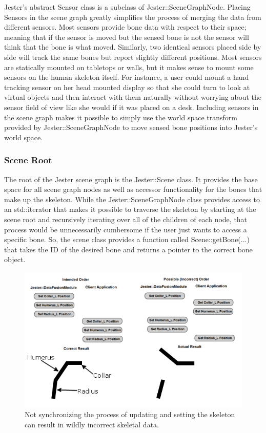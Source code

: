 Jester’s abstract Sensor class is a subclass of Jester::SceneGraphNode. Placing Sensors in the scene graph greatly simplifies the process of merging the data from different sensors. Most sensors provide bone data with respect to their space; meaning that if the sensor is moved but the sensed bone is not the sensor will think that the bone is what moved. Similarly, two identical sensors placed side by side will track the same bones but report slightly different positions. Most sensors are statically mounted on tabletops or walls, but it makes sense to mount some sensors on the human skeleton itself. For instance, a user could mount a hand tracking sensor on her head mounted display so that she could turn to look at virtual objects and then interact with them naturally without worrying about the sensor field of view like she would if it was placed on a desk. Including sensors in the scene graph makes it possible to simply use the world space transform provided by Jester::SceneGraphNode to move sensed bone positions into Jester’s world space. 

\subsubsection{Scene Root}\label{sec:scene_impl}

The root of the Jester scene graph is the Jester::Scene class. It provides the base space for all scene graph nodes as well as accessor functionality for the bones that make up the skeleton. While the Jester::SceneGraphNode class provides access to an std::iterator that makes it possible to traverse the skeleton by starting at the scene root and recursively iterating over all of the children of each node, that process would be unnecessarily cumbersome if the user just wants to access a specific bone. So, the scene class provides a function called Scene::getBone(...) that takes the ID of the desired bone and returns a pointer to the correct bone object.

\begin{figure}[h]
\centering
\includegraphics[width=1\textwidth]{figures/dataRace}
\caption{Not synchronizing the process of updating and setting the skeleton can result in wildly incorrect skeletal data.}
\label{fig:data_race}
\end{figure}

